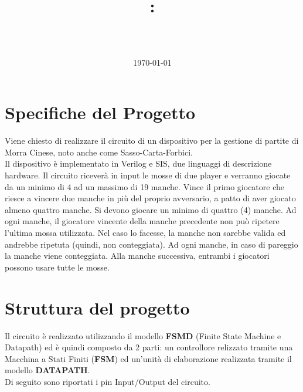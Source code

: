 \documentclass[a4paper,11pt]{article}
\title{
\insertLogo[8cm] \\
\vspace{0.7in}
\textmd{\textbf{\hmwkClass:\\ \hmwkTitle}}\\
\vspace{0.1in}\large{\textit{\hmwkAuthorName}}
\date{\today}
}
\begin{document}
  \maketitle
  \newpage
  \tableofcontents
  \newpage


\section{Specifiche del Progetto}
  Viene chiesto di realizzare il circuito di un dispositivo per la gestione di partite di Morra Cinese, noto anche come Sasso-Carta-Forbici. \\
  Il dispositivo è implementato in Verilog e SIS, due linguaggi di descrizione hardware. Il circuito riceverà in input le mosse di due player e verranno giocate da un minimo di 4 ad un massimo di 19 manche. Vince il primo giocatore che riesce a vincere due manche in più del proprio avversario, a patto di aver giocato almeno quattro manche. Si devono giocare un minimo di quattro (4) manche. Ad ogni manche, il giocatore vincente della manche precedente non può ripetere l’ultima mossa utilizzata. Nel caso lo facesse, la manche non sarebbe valida ed andrebbe ripetuta (quindi, non conteggiata). Ad ogni manche, in caso di pareggio la manche viene conteggiata. Alla manche successiva, entrambi i giocatori possono usare tutte le mosse.

\section{Struttura del progetto}
Il circuito è realizzato utilizzando il modello \textbf{{FSMD}} (Finite State Machine e Datapath) ed è quindi composto da 2 parti: un controllore relizzato tramite una Macchina a Stati Finiti (\textbf{FSM}) ed un'unità di elaborazione realizzata tramite il modello \textbf{DATAPATH}. \\
Di seguito sono riportati i pin Input/Output del circuito.
\end{document}
